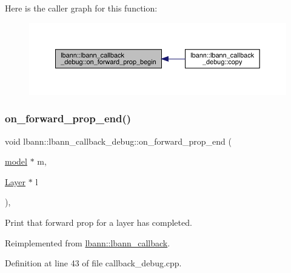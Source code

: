 Here is the caller graph for this function\+:\nopagebreak
\begin{figure}[H]
\begin{center}
\leavevmode
\includegraphics[width=350pt]{classlbann_1_1lbann__callback__debug_ac3e88ef582a7e3949b6e016ca2b17459_icgraph}
\end{center}
\end{figure}
\mbox{\label{classlbann_1_1lbann__callback__debug_acb3d05be6c600f4d61957ccf10606ddc}} 
\subsubsection{\texorpdfstring{on\+\_\+forward\+\_\+prop\+\_\+end()}{on\_forward\_prop\_end()}}
{\footnotesize\ttfamily void lbann\+::lbann\+\_\+callback\+\_\+debug\+::on\+\_\+forward\+\_\+prop\+\_\+end (\begin{DoxyParamCaption}\item[{\hyperlink{classlbann_1_1model}{model} $\ast$}]{m,  }\item[{\hyperlink{classlbann_1_1Layer}{Layer} $\ast$}]{l }\end{DoxyParamCaption})\hspace{0.3cm}{\ttfamily [override]}, {\ttfamily [virtual]}}

Print that forward prop for a layer has completed. 

Reimplemented from \hyperlink{classlbann_1_1lbann__callback_a5eff0a59fbce98a981d9cdd0547a3ad5}{lbann\+::lbann\+\_\+callback}.



Definition at line 43 of file callback\+\_\+debug.\+cpp.


